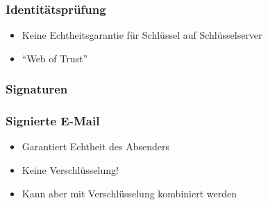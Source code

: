 \begin{frame}
  \frametitle{Identitätsprüfung}
  \begin{itemize}
    \item Keine Echtheitsgarantie für Schlüssel auf Schlüsselserver
    \item ``Web of Trust''
  \end{itemize}
\end{frame}

\begin{frame}
  \frametitle{Signaturen}
\end{frame}

\begin{frame}
  \frametitle{Signierte E-Mail}
  \begin{itemize}
    \item Garantiert Echtheit des Absenders
    \item Keine Verschlüsselung!
    \item Kann aber mit Verschlüsselung kombiniert werden
  \end{itemize}
\end{frame}